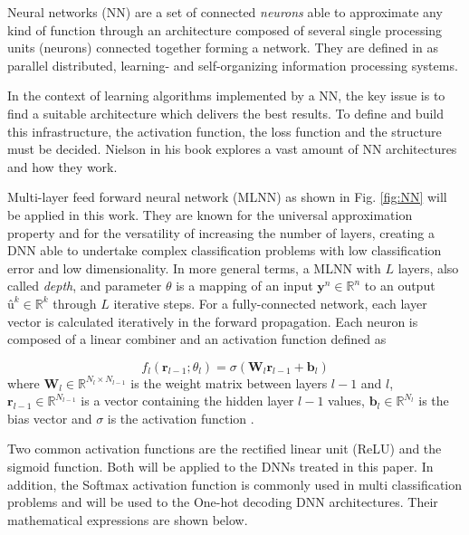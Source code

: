 \documentclass[conference]{IEEEtran}
\begin{document}
Neural networks (NN) are a set of connected \textit{neurons} able to approximate any kind of function through an architecture composed of several single processing units (neurons) connected together forming a network. They are defined in \cite{Ibnkahla} as parallel distributed, learning- and self-organizing information processing systems. 

In the context of learning algorithms implemented by a NN, the key issue is to find a suitable architecture which delivers the best results. To define and build this infrastructure, the activation function, the loss function and the structure must be decided. Nielson \cite{nielsenneural} in his book explores a vast amount of NN architectures and how they work. 

Multi-layer feed forward neural network (MLNN) as shown in Fig. \ref{fig:NN} will be applied in this work. They are known for the universal approximation property \cite{Ibnkahla} and for the versatility of increasing the number of layers, creating a DNN able to undertake complex classification problems with low classification error and low dimensionality. In more general terms, a MLNN with $L$ layers, also called \textit{depth}, and parameter $\theta$ is a mapping of an input $\textbf{y}^n \in \mathbb{R}^{n}$ to an output $\textbf{û}^k \in \mathbb{R}^{k}$ through $L$ iterative steps. For a fully-connected network, each layer vector is calculated iteratively in the forward propagation. Each neuron is composed of a linear combiner and an activation function defined as 

\begin{equation}\label{eq:eqFP}
	f_{l}\left( \textbf{r}_{l-1};\theta _{l}\right) = \sigma \left( \textbf{W}_{l}\textbf{r}_{l-1}+\textbf{b}_{l}\right)
\end{equation}
where $\textbf{W}_{l}\in \mathbb{R} ^{N_{l}\times N_{l-1}}$ is the weight matrix between layers $l-1$ and $l$, $\textbf{r}_{l-1} \in \mathbb{R} ^{N_{l-1}}$ is a vector containing the hidden layer $l-1$ values, $\textbf{b}_{l}\in \mathbb{R} ^{N_l}$ is the bias vector and $\sigma$ is the activation function \cite{DBLP:journals/corr/OSheaH17}.

Two common activation functions are the rectified linear unit (ReLU) and the sigmoid function. Both will be applied to the DNNs treated in this paper. In addition, the Softmax activation function is commonly used in multi classification problems and will be used to the One-hot decoding DNN architectures. Their mathematical expressions are shown below.
\end{document}
